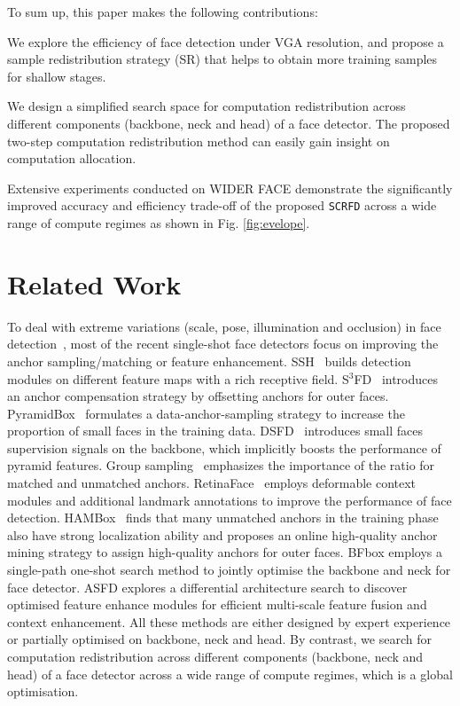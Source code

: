 \documentclass[10pt,twocolumn,letterpaper]{article}
\newcommand{\dsname}[1]{\texttt{\small #1}\xspace}
\newcommand{\scrfd}{\dsname{SCRFD}}
\newenvironment{tight_itemize}{
\begin{itemize}[leftmargin=20pt]
  \setlength{\topsep}{0pt}
  \setlength{\itemsep}{0pt}
  \setlength{\parskip}{0pt}
  \setlength{\parsep}{0pt}
}{\end{itemize}}
\begin{document}
To sum up, this paper makes the following contributions:
\begin{tight_itemize}
\setlength\itemsep{0em}
\item We explore the efficiency of face detection under VGA resolution, and propose a sample redistribution strategy (SR) that helps to obtain more training samples for shallow stages.

\item We design a simplified search space for computation redistribution across different components (backbone, neck and head) of a face detector. The proposed two-step computation redistribution method can easily gain insight on computation allocation.

\item Extensive experiments conducted on WIDER FACE demonstrate the significantly improved accuracy and efficiency trade-off of the proposed \scrfd across a wide range of compute regimes as shown in Fig. \ref{fig:evelope}. 
\end{tight_itemize}

\section{Related Work}
 To deal with extreme variations (\eg scale, pose, illumination and occlusion) in face detection~\cite{yang2016wider}, most of the recent single-shot face detectors focus on improving the anchor sampling/matching or feature enhancement.
SSH~\cite{najibi2017ssh} builds detection modules on different feature maps with a rich receptive field. S$^3$FD~\cite{zhang2017s3fd} introduces an anchor compensation strategy by offsetting anchors for outer faces. PyramidBox~\cite{tang2018pyramidbox} formulates a data-anchor-sampling strategy to increase the proportion of small faces in the training data. DSFD~\cite{li2019dsfd} introduces small faces supervision signals on the backbone, which implicitly boosts the performance of pyramid features. Group sampling~\cite{ming2019group} emphasizes the importance of the ratio for matched and unmatched anchors. RetinaFace~\cite{deng2019retinaface} employs deformable context modules and additional landmark annotations to improve the performance of face detection. HAMBox~\cite{liu2019hambox} finds that many unmatched anchors in the training phase also have strong localization ability and proposes an online high-quality anchor mining strategy to assign high-quality anchors for outer faces. BFbox \cite{liu2020bfbox} employs a single-path one-shot search method \cite{guo2019single} to jointly optimise the backbone and neck for face detector. ASFD \cite{zhang2020asfd} explores a differential architecture search to discover optimised feature enhance modules for efficient multi-scale feature fusion and context enhancement. All these methods are either designed by expert experience or partially optimised on backbone, neck and head. By contrast, we search for computation redistribution across different components (backbone, neck and head) of a face detector across a wide range of compute regimes, which is a global optimisation.
\end{document}
